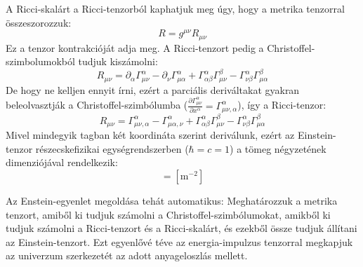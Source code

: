 \documentclass[../main.tex]{subfiles}
\begin{document}
A Ricci-skalárt a Ricci-tenzorból kaphatjuk meg úgy, hogy a metrika tenzorral összeszorozzuk:
\begin{equation}
    R = g^{\mu \nu} R_{\mu \nu}
\end{equation}
Ez a tenzor kontrakcióját adja meg. A Ricci-tenzort pedig a Christoffel-szimbolumokból tudjuk kiszámolni:
\begin{equation}
    R_{\mu \nu} = \partial_{\alpha} \Gamma^{\alpha}_{\mu \nu} - \partial_{\nu} \Gamma^{\alpha}_{\mu \alpha} + \Gamma^{\alpha}_{\alpha \beta} \Gamma^{\beta}_{\mu \nu} - \Gamma^{\alpha}_{\nu \beta} \Gamma^{\beta}_{\mu \alpha}
\end{equation}
De hogy ne kelljen ennyit írni, ezért a parciális deriváltakat gyakran beleolvasztják a Christoffel-szimbólumba ($\frac{\partial \Gamma^\alpha_{\mu \nu}}{\partial x^\alpha} = \Gamma^{\alpha}_{\mu \nu, \alpha}$), így a Ricci-tenzor:
\begin{equation}
    R_{\mu \nu} = \Gamma^{\alpha}_{\mu \nu, \alpha} - \Gamma^{\alpha}_{\mu \alpha, \nu} + \Gamma^{\alpha}_{\alpha \beta} \Gamma^{\beta}_{\mu \nu} - \Gamma^{\alpha}_{\nu \beta} \Gamma^{\beta}_{\mu \alpha}
\end{equation}
Mivel mindegyik tagban két koordináta szerint deriválunk, ezért az Einstein-tenzor részecskefizikai egységrendszerben ($\hbar = c = 1$) a tömeg négyzetének dimenziójával rendelkezik:
\begin{equation}
    [G_{\mu \nu}] = [\text{m}^{-2}]
\end{equation}

Az Enstein-egyenlet megoldása tehát automatikus: Meghatározzuk a metrika tenzort, amiből ki tudjuk számolni a Christoffel-szimbólumokat, amikből ki tudjuk számolni a Ricci-tenzort és a Ricci-skalárt,
és ezekből össze tudjuk állítani az Einstein-tenzort. Ezt egyenlővé téve az energia-impulzus tenzorral megkapjuk az univerzum szerkezetét az adott anyageloszlás mellett.
\end{document}
